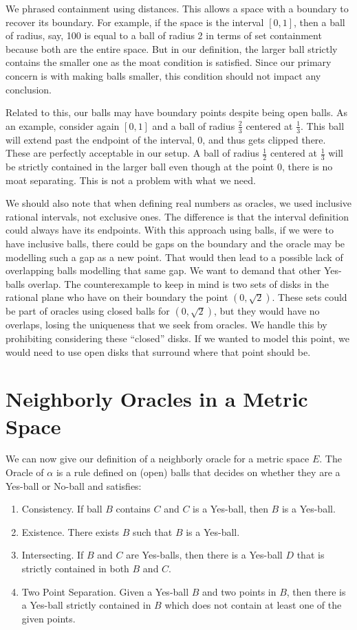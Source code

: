 \documentclass[12pt]{article}
\begin{document}
We phrased containment using distances. This allows a space with a boundary to recover its boundary. For example, if the space is  the interval $[0, 1]$, then a ball of radius, say, 100 is equal to a ball of radius 2 in terms of set containment because both are the entire space. But in our definition, the larger ball strictly contains the smaller one as the moat condition is satisfied. Since our primary concern is with making balls smaller, this condition should not impact any conclusion. 

Related to this, our balls may have boundary points despite being open balls. As an example, consider again $[0,1]$ and a ball of radius $\frac{2}{3}$ centered at $\frac{1}{3}$. This ball will extend past the endpoint of the interval, $0$, and thus gets clipped there. These are perfectly acceptable in our setup. A ball of radius $\frac{1}{2}$ centered at $\frac{1}{3}$ will be strictly contained in the larger ball even though at the point $0$, there is no moat separating. This is not a problem with what we need. 

We should also note that when defining real numbers as oracles, we used inclusive rational intervals, not exclusive ones. The difference is that the interval definition could always have its endpoints. With this approach using balls, if we were to have inclusive balls, there could be gaps on the boundary and the oracle may be modelling such a gap as a new point. That would then lead to a possible lack of overlapping balls modelling that same gap. We want to demand that other Yes-balls overlap. The counterexample to keep in mind is two sets of disks in the rational plane who have on their boundary the point $(0, \sqrt{2})$. These sets could be part of oracles using closed balls for $(0, \sqrt{2})$, but they would have no overlaps, losing the uniqueness that we seek from oracles. We handle this by prohibiting considering these ``closed'' disks. If we wanted to model this point, we would need to use open disks that surround where that point should be. 

\section{Neighborly Oracles in a Metric Space}

We can now give our definition of a neighborly oracle for a metric space $E$. The Oracle of $\alpha$ is a rule defined on (open) balls that decides on whether they are a Yes-ball or No-ball and satisfies: 
\begin{enumerate}
    \item Consistency. If ball $B$ contains $C$ and $C$ is a Yes-ball, then $B$ is a Yes-ball.
    \item Existence. There exists $B$ such that $B$ is a Yes-ball.
    \item Intersecting. If $B$ and $C$ are Yes-balls, then there is a Yes-ball $D$ that is strictly contained in both $B$ and $C$. 
    \item Two Point Separation. Given a Yes-ball $B$ and two points in $B$, then there is a Yes-ball strictly contained in $B$ which does not contain at least one of the given points. 
\end{enumerate}
\end{document}
